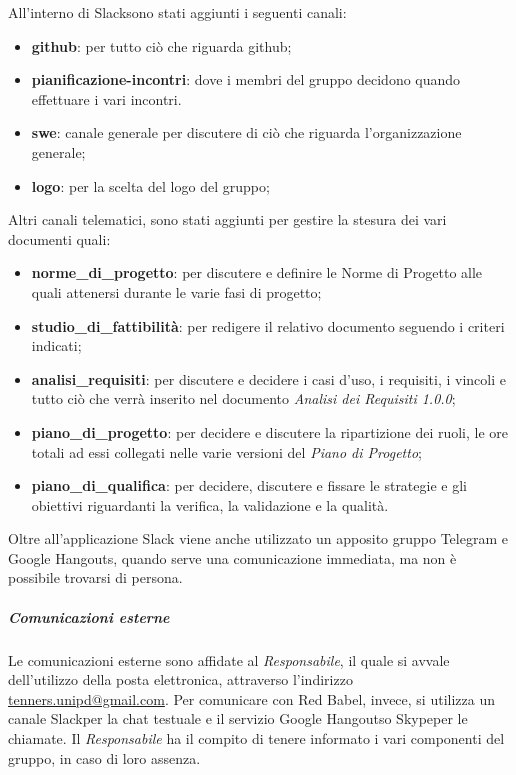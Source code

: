   					All'interno di Slack\glo sono stati aggiunti i seguenti canali:
   					\begin{itemize}
   						\item \textbf{github}: per tutto ciò che riguarda github;
   						\item \textbf{pianificazione-incontri}: dove i membri del gruppo decidono quando effettuare i vari incontri.
   						\item \textbf{swe}: canale generale per discutere di ciò che riguarda l'organizzazione generale;
   						\item \textbf{logo}: per la scelta del logo del gruppo;

   					\end{itemize}
   					Altri canali telematici, sono stati aggiunti per gestire la stesura dei vari documenti quali:
   					\begin{itemize}
   						\item \textbf{norme\_di\_progetto}: per discutere e definire le Norme di Progetto alle quali attenersi durante le varie fasi di progetto;
   						\item \textbf{studio\_di\_fattibilità}: per redigere il relativo documento seguendo i criteri indicati;
   						\item \textbf{analisi\_requisiti}: per discutere e decidere i casi d'uso, i requisiti, i vincoli e tutto ciò che verrà inserito nel documento \textit{Analisi dei Requisiti 1.0.0};
   						\item \textbf{piano\_di\_progetto}: per decidere e discutere la ripartizione dei ruoli, le ore totali ad essi collegati nelle varie versioni del \textit{Piano di Progetto};
   						\item \textbf{piano\_di\_qualifica}: per decidere, discutere e fissare le strategie e gli obiettivi riguardanti la verifica, la validazione e la qualità.
   					\end{itemize}
   					Oltre all'applicazione Slack viene anche utilizzato un apposito gruppo Telegram e Google Hangouts, quando serve una comunicazione immediata, ma non è possibile trovarsi di persona.
   				\subparagraph{Comunicazioni esterne}
   					Le comunicazioni esterne sono affidate al \textit{Responsabile}, il quale si avvale dell'utilizzo della posta elettronica, attraverso l'indirizzo \href{mailto:tenners.unipd@gmail.com}{tenners.unipd@gmail.com}.
   					Per comunicare con Red Babel, invece, si utilizza un canale Slack\glo per la chat testuale e il servizio Google Hangouts\glos o Skype\glo per le chiamate.
   					Il \textit{Responsabile} ha il compito di tenere informato i vari componenti del gruppo, in caso di loro assenza.
